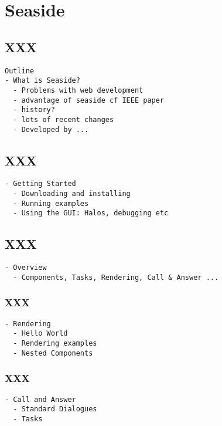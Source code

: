 \documentclass[a4paper,10pt,twoside]{book}
\begin{document}
	\sloppy
\fi
\chapter{Seaside}
\label{cha:seaside}


\section{XXX}

\begin{verbatim}
Outline
- What is Seaside?
  - Problems with web development
  - advantage of seaside cf IEEE paper
  - history?
  - lots of recent changes
  - Developed by ...
\end{verbatim}

\section{XXX}
\begin{verbatim}
- Getting Started
  - Downloading and installing
  - Running examples
  - Using the GUI: Halos, debugging etc
\end{verbatim}

\section{XXX}
\begin{verbatim}
- Overview
  - Components, Tasks, Rendering, Call & Answer ...
\end{verbatim}

\subsection{XXX}
\begin{verbatim}
- Rendering
  - Hello World
  - Rendering examples
  - Nested Components
\end{verbatim}
\subsection{XXX}
\begin{verbatim}
- Call and Answer
  - Standard Dialogues
  - Tasks
\end{verbatim}
\end{document}
